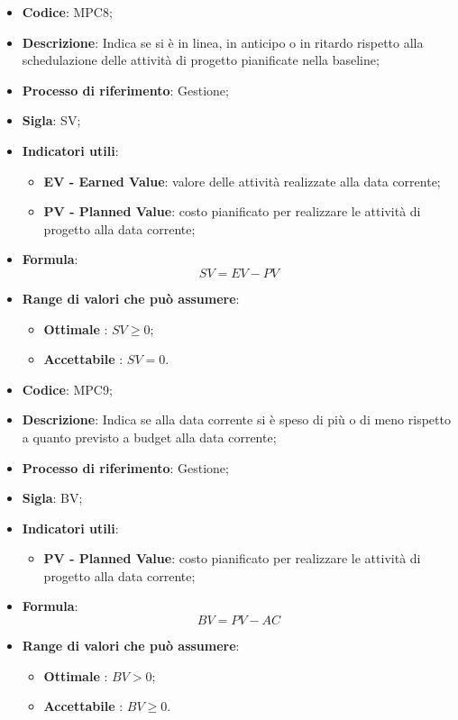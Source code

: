\vspace{-1cm}
\begin{itemize}
	\item \textbf{Codice}: MPC8;
	\item \textbf{Descrizione}: Indica se si è in linea, in anticipo o in ritardo rispetto alla schedulazione delle attività di progetto pianificate nella baseline;
	\item \textbf{Processo di riferimento}: Gestione;
	\item \textbf{Sigla}: SV;
	\item \textbf{Indicatori utili}: 
		\begin{itemize}
		\item \textbf{EV - Earned Value}: valore delle attività realizzate alla data corrente;
			\item \textbf{PV - Planned Value}: costo pianificato per realizzare le attività di progetto alla data corrente;
		\end{itemize}
	\item \textbf{Formula}: \[ SV = EV - PV \]
	\item \textbf{Range di valori che può assumere}: 
		\begin{itemize}
			\item \textbf{Ottimale} : $SV \geq 0$;
			\item \textbf{Accettabile} : $SV = 0$.
		\end{itemize}
\end{itemize}
\vspace{-1cm}
\begin{itemize}
	\item \textbf{Codice}: MPC9;
	\item \textbf{Descrizione}: Indica se alla data corrente si è speso di più o di meno rispetto a quanto previsto a budget alla data corrente;
	\item \textbf{Processo di riferimento}: Gestione;
	\item \textbf{Sigla}: BV;
	\item \textbf{Indicatori utili}: 
		\begin{itemize}
			\item \textbf{PV - Planned Value}: costo pianificato per realizzare le attività di progetto alla data corrente;
		\end{itemize}
	\item \textbf{Formula}: \[ BV = PV - AC\]
	\item \textbf{Range di valori che può assumere}: 
		\begin{itemize}
			\item \textbf{Ottimale} : $BV > 0$;
			\item \textbf{Accettabile} : $BV \geq 0$.
		\end{itemize}
\end{itemize}

